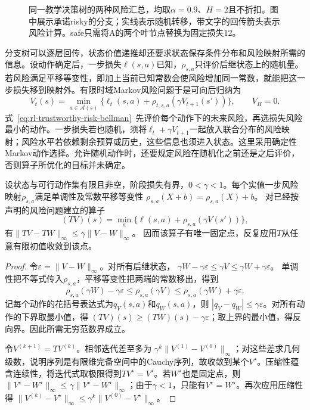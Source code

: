 \begin{figure}[t]
  \centering
  
  \caption{同一教学决策树的两种风险汇总，均取$\alpha=0.9$、$H=2$且不折扣。图中展示承诺risky的分支；实线表示随机转移，带文字的回传箭头表示风险计算。safe只需将A的两个叶节点替换为固定损失12。}
  \label{fig:rl-trustworthy-risk-tree}
\end{figure}

分支树可以逐层回传，状态价值递推却还要求状态保存条件分布和风险映射所需的信息。设动作确定后，一步损失$\ell(s,a)$已知，$\rho_{s,a}$只评价后继状态上的随机量。若风险满足平移等变性，即加上当前已知常数会使风险增加同一常数，就能把这一步损失移到映射外。有限时域Markov风险问题于是可向后归纳为
\begin{equation}
  V_t(s)=\min_{a\in\mathcal A(s)}
    \{\ell_t(s,a)+\rho_{t,s,a}(\gamma V_{t+1}(s'))\},
  \qquad V_H=0.
  \label{eq:rl-trustworthy-risk-bellman}
\end{equation}
式~\eqref{eq:rl-trustworthy-risk-bellman}~先评价每个动作下的未来风险，再选损失风险最小的动作。一步损失若也随机，须将$\ell_t+\gamma V_{t+1}$一起放入联合分布的风险映射；风险水平若依赖剩余预算或历史，这些信息也须进入状态。这里采用确定性Markov动作选择。允许随机动作时，还要规定风险在随机化之前还是之后评价，否则算子所优化的目标并未确定。

\begin{theorem}[折扣风险算子的压缩性]
  \label{thm:rl-trustworthy-risk-contraction}
  设状态与可行动作集有限且非空，阶段损失有界，$0<\gamma<1$。每个实值一步风险映射$\rho_{s,a}$满足单调性及常数平移等变性
  $\rho_{s,a}(X+b)=\rho_{s,a}(X)+b$。
  对已经按声明的风险问题建立的算子
  \[
    (TV)(s)=\min_a\{\ell(s,a)+\rho_{s,a}(\gamma V(s'))\},
  \]
  有$\lVert TV-TW\rVert_\infty\leq\gamma\lVert V-W\rVert_\infty$。
  因而该算子有唯一固定点，反复应用$T$从任意有限初值收敛到该点。
\end{theorem}
\begin{proof}
  令$\varepsilon=\lVert V-W\rVert_\infty$。对所有后继状态，
  $\gamma W-\gamma\varepsilon\leq\gamma V\leq\gamma W+\gamma\varepsilon$。
  单调性把不等式传入$\rho_{s,a}$，平移等变性把两端的常数移出，得到
  \[
    \rho_{s,a}(\gamma W)-\gamma\varepsilon
      \leq\rho_{s,a}(\gamma V)
      \leq\rho_{s,a}(\gamma W)+\gamma\varepsilon.
  \]
  记每个动作的花括号表达式为$q_V(s,a)$和$q_W(s,a)$，则
  $|q_V-q_W|\leq\gamma\varepsilon$。对所有动作的下界取最小值，得
  $(TV)(s)\geq(TW)(s)-\gamma\varepsilon$；取上界的最小值，得反向界。因此所需无穷范数界成立。

  令$V^{(k+1)}=TV^{(k)}$。相邻迭代差至多为
  $\gamma^k\lVert V^{(1)}-V^{(0)}\rVert_\infty$；对这些差求几何级数，说明序列是有限维完备空间中的Cauchy序列，故收敛到某个$V^\star$。压缩性蕴含连续性，将迭代式取极限得到$TV^\star=V^\star$。若$W^\star$也是固定点，则
  $\lVert V^\star-W^\star\rVert_\infty\leq\gamma\lVert V^\star-W^\star\rVert_\infty$；由于$\gamma<1$，只能有$V^\star=W^\star$。再次应用压缩性得
  $\lVert V^{(k)}-V^\star\rVert_\infty\leq\gamma^k\lVert V^{(0)}-V^\star\rVert_\infty$。
\end{proof}

